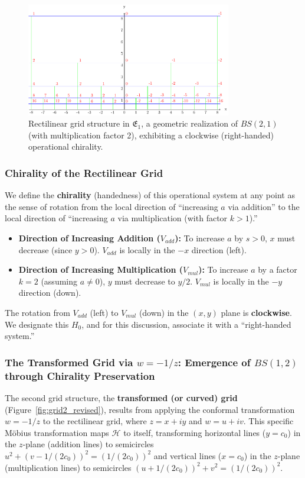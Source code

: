 \begin{figure}[ht]
\centering
\includegraphics[width=0.8\textwidth]{images/01-grid-example-1.pdf}
\caption{Rectilinear grid structure in $\mathfrak{E}_1$, a geometric realization of $BS(2,1)$ (with multiplication factor 2), exhibiting a clockwise (right-handed) operational chirality.}\label{fig:grid1_revised}
\end{figure}

\subsubsection{Chirality of the Rectilinear Grid}
We define the \textbf{chirality} (handedness) of this operational system at any point as the sense of rotation from the local direction of ``increasing $a$ via addition'' to the local direction of ``increasing $a$ via multiplication (with factor $k>1$).''
\begin{itemize}
    \item \textbf{Direction of Increasing Addition ($V_{add}$):} To increase $a$ by $s>0$, $x$ must decrease (since $y>0$). $V_{add}$ is locally in the $-x$ direction (left).
    \item \textbf{Direction of Increasing Multiplication ($V_{mul}$):} To increase $a$ by a factor $k=2$ (assuming $a \neq 0$), $y$ must decrease to $y/2$. $V_{mul}$ is locally in the $-y$ direction (down).
\end{itemize}
The rotation from $V_{add}$ (left) to $V_{mul}$ (down) in the $(x,y)$ plane is \textbf{clockwise}. We designate this $H_0$, and for this discussion, associate it with a ``right-handed system.''

\subsubsection{The Transformed Grid via $w = -1/z$: Emergence of $BS(1,2)$ through Chirality Preservation}
The second grid structure, the \textbf{transformed (or curved) grid} (Figure~\ref{fig:grid2_revised}), results from applying the conformal transformation $w = -1/z$ to the rectilinear grid, where $z=x+iy$ and $w=u+iv$. %
This specific M\"obius transformation maps $\mathcal{H}$ to itself, transforming horizontal lines ($y=c_0$) in the $z$-plane (addition lines) to semicircles $u^2 + (v - 1/(2c_0))^2 = (1/(2c_0))^2$ and vertical lines ($x=c_0$) in the $z$-plane (multiplication lines) to semicircles $(u + 1/(2c_0))^2 + v^2 = (1/(2c_0))^2$.


